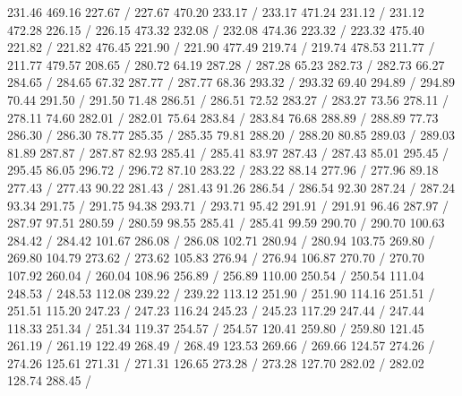 { 231.46 469.16 227.67 /
 227.67 470.20 233.17 /
 233.17 471.24 231.12 /
 231.12 472.28 226.15 /
 226.15 473.32 232.08 /
 232.08 474.36 223.32 /
 223.32 475.40 221.82 /
 221.82 476.45 221.90 /
 221.90 477.49 219.74 /
 219.74 478.53 211.77 /
 211.77 479.57 208.65 /
\setsolid
{} 280.72 64.19 287.28 /
 287.28 65.23 282.73 /
 282.73 66.27 284.65 /
 284.65 67.32 287.77 /
 287.77 68.36 293.32 /
 293.32 69.40 294.89 /
 294.89 70.44 291.50 /
 291.50 71.48 286.51 /
 286.51 72.52 283.27 /
 283.27 73.56 278.11 /
 278.11 74.60 282.01 /
 282.01 75.64 283.84 /
 283.84 76.68 288.89 /
 288.89 77.73 286.30 /
 286.30 78.77 285.35 /
 285.35 79.81 288.20 /
 288.20 80.85 289.03 /
 289.03 81.89 287.87 /
 287.87 82.93 285.41 /
 285.41 83.97 287.43 /
 287.43 85.01 295.45 /
 295.45 86.05 296.72 /
 296.72 87.10 283.22 /
 283.22 88.14 277.96 /
 277.96 89.18 277.43 /
 277.43 90.22 281.43 /
 281.43 91.26 286.54 /
 286.54 92.30 287.24 /
 287.24 93.34 291.75 /
 291.75 94.38 293.71 /
 293.71 95.42 291.91 /
 291.91 96.46 287.97 /
 287.97 97.51 280.59 /
 280.59 98.55 285.41 /
 285.41 99.59 290.70 /
 290.70 100.63 284.42 /
 284.42 101.67 286.08 /
 286.08 102.71 280.94 /
 280.94 103.75 269.80 /
 269.80 104.79 273.62 /
 273.62 105.83 276.94 /
 276.94 106.87 270.70 /
 270.70 107.92 260.04 /
 260.04 108.96 256.89 /
 256.89 110.00 250.54 /
 250.54 111.04 248.53 /
 248.53 112.08 239.22 /
 239.22 113.12 251.90 /
 251.90 114.16 251.51 /
 251.51 115.20 247.23 /
 247.23 116.24 245.23 /
 245.23 117.29 247.44 /
 247.44 118.33 251.34 /
 251.34 119.37 254.57 /
 254.57 120.41 259.80 /
 259.80 121.45 261.19 /
 261.19 122.49 268.49 /
 268.49 123.53 269.66 /
 269.66 124.57 274.26 /
 274.26 125.61 271.31 /
 271.31 126.65 273.28 /
 273.28 127.70 282.02 /
 282.02 128.74 288.45 /
}
